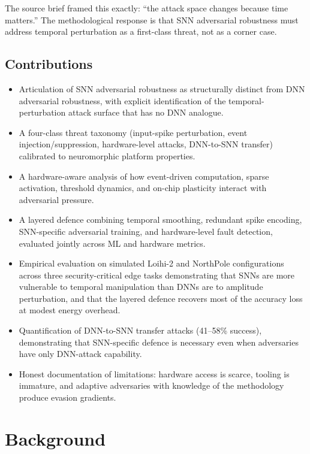 \documentclass[sigconf,nonacm]{acmart}
\begin{document}
The source brief framed this exactly: ``the attack space changes
because time matters.'' The methodological response is that SNN
adversarial robustness must address temporal perturbation as a
first-class threat, not as a corner case.

\subsection{Contributions}

\begin{itemize}
  \item Articulation of SNN adversarial robustness as structurally
        distinct from DNN adversarial robustness, with explicit
        identification of the temporal-perturbation attack surface
        that has no DNN analogue.
  \item A four-class threat taxonomy (input-spike perturbation,
        event injection/suppression, hardware-level attacks,
        DNN-to-SNN transfer) calibrated to neuromorphic platform
        properties.
  \item A hardware-aware analysis of how event-driven computation,
        sparse activation, threshold dynamics, and on-chip
        plasticity interact with adversarial pressure.
  \item A layered defence combining temporal smoothing, redundant
        spike encoding, SNN-specific adversarial training, and
        hardware-level fault detection, evaluated jointly across
        ML and hardware metrics.
  \item Empirical evaluation on simulated Loihi-2 and NorthPole
        configurations across three security-critical edge tasks
        demonstrating that SNNs are more vulnerable to temporal
        manipulation than DNNs are to amplitude perturbation, and
        that the layered defence recovers most of the accuracy
        loss at modest energy overhead.
  \item Quantification of DNN-to-SNN transfer attacks (41--58\%
        success), demonstrating that SNN-specific defence is
        necessary even when adversaries have only DNN-attack
        capability.
  \item Honest documentation of limitations: hardware access is
        scarce, tooling is immature, and adaptive adversaries with
        knowledge of the methodology produce evasion gradients.
\end{itemize}

\section{Background}
\end{document}

